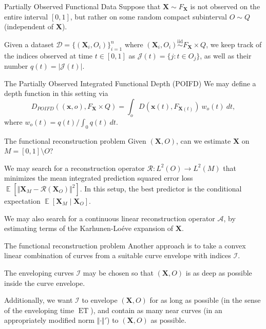 \documentclass[handout, notes]{beamer}
\newcommand{\vx}{\bm{x}}
\newcommand{\vX}{\bm{X}}
\newcommand{\iid}{\overset{\text{iid}}{\sim}}
\DeclareMathOperator{\E}{\mathbb{E}}
\DeclareMathOperator{\ET}{ET}
\newcommand{\norm}[1]{\Vert #1 \Vert}
\begin{document}
    \begin{frame}{Partially Observed Functional Data}
        Suppose that $\vX \sim F_{\vX}$ is not observed on the entire interval
        $[0, 1]$, but rather on some random compact subinterval $O \sim Q$
        (independent of $\vX$).

        Given a dataset $\mathscr{D} = \{(\vX_i, O_i)\}_{i = 1}^n$ where
        $(\vX_i, O_i) \iid F_{\vX} \times Q$, we keep track of the indices
        observed at time $t \in [0, 1]$ as $\mathscr{J}(t) = \{j\colon t \in
        O_j\}$, as well as their number $q(t) = |\mathscr{J}(t)|$.
    \end{frame}

    \begin{frame}{The Partially Observed Integrated Functional Depth (POIFD)}
        We may define a depth function in this setting via \[
            D_{POIFD}((\vx, o), F_{\vX} \times Q) = \int_{o} D(\vx(t), F_{\vX(t)}) \:w_o(t)\:dt,
        \] where $w_o(t) = q(t) / \int_0 q(t)\:dt$.
    \end{frame}


    \begin{frame}{The functional reconstruction problem}
        Given $(\vX, O)$, can we estimate $\vX$ on $M = [0, 1]\setminus O$?

        We may search for a reconstruction operator $\mathcal{R}\colon L^2(O)
        \to L^2(M)$ that minimizes the mean integrated prediction squared
        error loss $\E[\norm{\vX_M - \mathcal{R}(\vX_O)}^2]$.
        In this setup, the best predictor is the conditional expectation
        $\E[\vX_M \mid \vX_O]$.

        We may also search for a continuous linear reconstruction operator
        $\mathscr{A}$, by estimating terms of the Karhunen-Lo\'eve expansion
        of $\vX$.
    \end{frame}


    \begin{frame}{The functional reconstruction problem}
        Another approach is to take a convex linear combination of curves from
        a suitable curve envelope with indices $\mathscr{I}$.

        The enveloping curves $\mathscr{I}$ may be chosen so that $(\vX, O)$
        is as deep as possible inside the curve envelope.

        Additionally, we want $\mathscr{I}$ to envelope $(\vX, O)$ for as long
        as possible (in the sense of the enveloping time $\ET$), and contain
        as many near curves (in an appropriately modified norm
        $\norm{\cdot}'$) to $(\vX, O)$ as possible.
    \end{frame}
\end{document}
